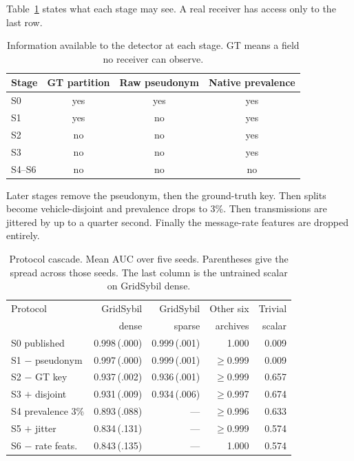 \documentclass[journal,twoside]{IEEEtran}
\begin{document}
Table~\ref{tab:observable} states what each stage may see.
A real receiver has access only to the last row.

\begin{table}[t]
\caption{Information available to the detector at each stage.
GT means a field no receiver can observe.}
\label{tab:observable}
\centering
\footnotesize
\begin{tabular}{@{}lccc@{}}
\toprule
Stage & GT partition & Raw pseudonym & Native prevalence \\
\midrule
S0 & yes & yes & yes \\
S1 & yes & no & yes \\
S2 & no & no & yes \\
S3 & no & no & yes \\
S4--S6 & no & no & no \\
\bottomrule
\end{tabular}
\end{table}

Later stages remove the pseudonym, then the ground-truth key.
Then splits become vehicle-disjoint and prevalence drops to 3\%.
Then transmissions are jittered by up to a quarter second.
Finally the message-rate features are dropped entirely.

\begin{table}[t]
\caption{Protocol cascade. Mean AUC over five seeds.
Parentheses give the spread across those seeds.
The last column is the untrained scalar on GridSybil dense.}
\label{tab:cascade}
\centering
\footnotesize
\begin{tabular}{@{}lrrrr@{}}
\toprule
Protocol & GridSybil & GridSybil & Other six & Trivial \\
 & dense & sparse & archives & scalar \\
\midrule
S0 published & 0.998\,{\tiny(.000)} & 0.999\,{\tiny(.001)} & 1.000 & 0.009 \\
S1 $-$ pseudonym & 0.997\,{\tiny(.000)} & 0.999\,{\tiny(.001)} & $\geq$0.999 & 0.009 \\
S2 $-$ GT key & 0.937\,{\tiny(.002)} & 0.936\,{\tiny(.001)} & $\geq$0.999 & 0.657 \\
S3 $+$ disjoint & 0.931\,{\tiny(.009)} & 0.934\,{\tiny(.006)} & $\geq$0.997 & 0.674 \\
S4 prevalence 3\% & 0.893\,{\tiny(.088)} & --- & $\geq$0.996 & 0.633 \\
S5 $+$ jitter & 0.834\,{\tiny(.131)} & --- & $\geq$0.999 & 0.574 \\
S6 $-$ rate feats. & 0.843\,{\tiny(.135)} & --- & 1.000 & 0.574 \\
\bottomrule
\end{tabular}
\end{table}
\end{document}
